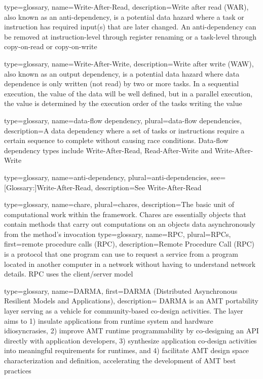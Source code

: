 {
  type=glossary,
  name={Write-After-Read},
  description={Write after read (\gls{WAR}), also known as an anti-dependency, is a potential data hazard where a task or instruction has required input(s) that are later changed. An anti-dependency can be removed at instruction-level through register renaming or a task-level through copy-on-read or copy-on-write}
}

{
  type=glossary,
  name={Write-After-Write},
  description={Write after write (\gls{WAW}), also known as an output
  dependency, is a potential data hazard where data dependence is only
  written (not read) by two or more tasks. In a sequential execution, the value
  of the data will be well defined, but in a parallel execution, the
  value is determined by the execution order of the tasks writing the
  value}
}

{
  type=glossary,
  name={data-flow dependency},
  plural={data-flow dependencies},
  description={A data dependency where a set of tasks or instructions require a certain sequence to complete without causing race conditions. Data-flow dependency types include \gls{Write-After-Read}, \gls{Read-After-Write} and \gls{Write-After-Write}}
}

{
  type=glossary,
  name={anti-dependency},
  plural={anti-dependencies},
  see={[Glossary:]{Write-After-Read}},
  description={See \gls{Write-After-Read}}
}

{
  type=glossary,
  name={chare},
  plural={chares},
  description={The basic unit of computational work within the \Charm{} framework. Chares are essentially \protect\CC{} objects that contain methods that carry out computations on an objects data asynchronously from the method's invocation}
}
{
  type=glossary,
  name={RPC},
  plural={RPCs},
  first={remote procedure calls (RPC)},
  description={Remote Procedure Call (RPC) is a protocol that one
  program can use to request a service from a program located in
  another computer in a network without having to understand network
  details. RPC uses the client/server model}
}

{
  type=glossary,
  name={DARMA},
  first={DARMA (Distributed Asynchronous Resilient Models and Applications)},
  description={ DARMA is an AMT portability layer serving as a vehicle for
    community-based co-design activities.  The layer aims to 1) insulate applications from runtime system and hardware idiosyncrasies,
2) improve AMT runtime programmability by co-designing an API directly with
  application developers, 3) synthesize application co-design activities into
  meaningful requirements for runtimes, and 4) 
facilitate AMT design space characterization and definition, accelerating the development of AMT best practices}
}

